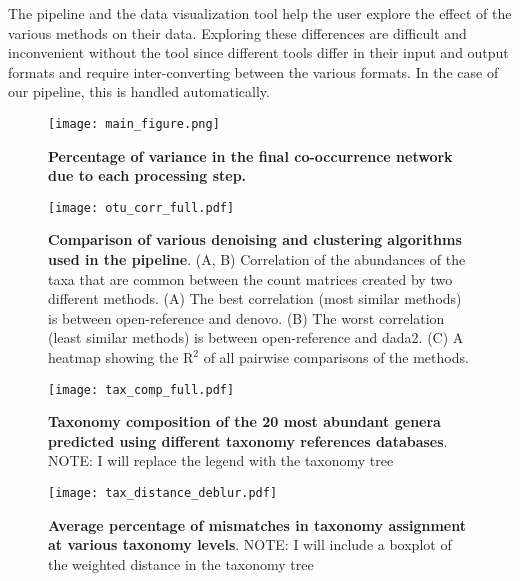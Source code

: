   The pipeline and the data visualization tool help the user explore the effect of the various methods on their data.
  Exploring these differences are difficult and inconvenient without the tool since different tools differ in their input and output formats and require inter-converting between the various formats.
  In the case of our pipeline, this is handled automatically.

  \begin{figure}[h]
    \begin{center}
      \texttt{[image: main\_figure.png]}
      \caption{\textbf{Percentage of variance in the final co-occurrence network due to each processing step.} }
      \label{fig:variance}
    \end{center}
  \end{figure}

  \begin{figure}[h]
    \begin{center}
      \texttt{[image: otu\_corr\_full.pdf]}
      \caption{
        \textbf{Comparison of various denoising and clustering algorithms used in the pipeline}.
        (A, B) Correlation of the abundances of the taxa that are common between the count matrices created by two different methods.
        (A) The best correlation (most similar methods) is between open-reference and denovo.
        (B) The worst correlation (least similar methods) is between open-reference and dada2.
        (C) A heatmap showing the $\mathrm{R}^2$ of all pairwise comparisons of the methods.
      }
      \label{fig:otu_correlations}
    \end{center}
  \end{figure}

  \begin{figure}[h]
    \begin{center}
      \texttt{[image: tax\_comp\_full.pdf]}
      \caption{\textbf{Taxonomy composition of the 20 most abundant genera predicted using different taxonomy references databases}. NOTE: I will replace the legend with the taxonomy tree}
      \label{fig:tax_comparison}
    \end{center}
  \end{figure}

  \begin{figure}[h]
    \begin{center}
      \texttt{[image: tax\_distance\_deblur.pdf]}
      \caption{\textbf{Average percentage of mismatches in taxonomy assignment at various taxonomy levels}. NOTE: I will include a boxplot of the weighted distance in the taxonomy tree}
      \label{fig:tax_mismatches}
    \end{center}
  \end{figure}

